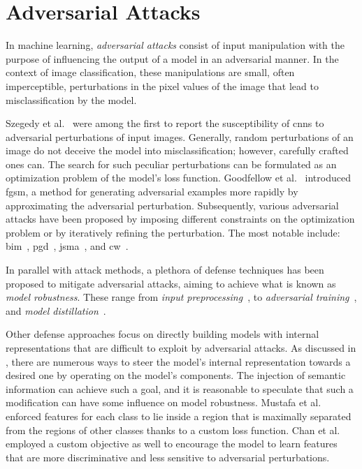 \section{Adversarial Attacks}
\label{sec:adversarial-attacks-related-work}

In machine learning, \emph{adversarial attacks} consist of input manipulation with the purpose of influencing the output of a model in an adversarial manner.
In the context of image classification, these manipulations are small, often imperceptible, perturbations in the pixel values of the image that lead to misclassification by the model.

Szegedy et al.~\cite{IntriguingPropSzeged2013} were among the first to report the susceptibility of \acrshort{cnn}s to adversarial perturbations of input images. Generally, random perturbations of an image do not deceive the model into misclassification; however, carefully crafted ones can. The search for such peculiar perturbations can be formulated as an optimization problem of the model's loss function.
Goodfellow et al.~\cite{ExplainingAndGoodfe2014} introduced \acrfull{fgsm}, a method for generating adversarial examples more rapidly by approximating the adversarial perturbation.
Subsequently, various adversarial attacks have been proposed by imposing different constraints on the optimization problem or by iteratively refining the perturbation. The most notable include: \acrfull{bim}~\cite{AdversarialExaKuraki2016}, \acrfull{pgd}~\cite{TowardsDeepLeMadry2017}, \acrfull{jsma}~\cite{MaximalJacobiaWiyatn2018}, and \acrfull{cw}~\cite{TowardsEvaluatCarlin2016}.

In parallel with attack methods, a plethora of defense techniques has been proposed to mitigate adversarial attacks, aiming to achieve what is known as \emph{model robustness}. These range from \emph{input preprocessing}~\cite{FeatureSqueeziXuWe2017, CounteringAdveGuoC2017, AStudyOfTheDziuga2016, DefenseAgainstLiao2017}, to \emph{adversarial training}~\cite{ExplainingAndGoodfe2014, TowardsDeepLeMadry2017, EnsembleAdversTramer2017, AdversarialMacKuraki2016}, and \emph{model distillation}~\cite{DistillationAsPapern2015, TheLimitationsPapern2015, DefensiveDistiCarlin2016, AdversariallyRGoldbl2019}.

Other defense approaches focus on directly building models with internal representations that are difficult to exploit by adversarial attacks. As discussed in , there are numerous ways to steer the model's internal representation towards a desired one by operating on the model's components. The injection of semantic information can achieve such a goal, and it is reasonable to speculate that such a modification can have some influence on model robustness. Mustafa et al.~\cite{AdversarialDefMustaf2019} enforced features for each class to lie inside a region that is maximally separated from the regions of other classes thanks to a custom loss function. Chan et al.~\cite{ImprovingAdverChen2019} employed a custom objective as well to encourage the model to learn features that are more discriminative and less sensitive to adversarial perturbations.
